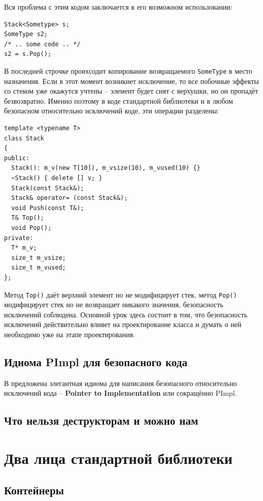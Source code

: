 \documentclass[a4paper,12pt,oneside]{article}
\begin{document}
Вся проблема с этим кодом заключается в его возможном использовании:

\begin{lstlisting}
Stack<Sometype> s;
SomeType s2;
/* .. some code .. */
s2 = s.Pop();
\end{lstlisting}

В последней строчке проихсодит копирование возвращаемого \lstinline!SomeType! в место назначения. Если в этот момент возникнет исключение, то все побочные эффекты со стеком уже окажутся учтены -- элемент будет снят с верхушки, но он пропадёт безвозвратно. Именно поэтому в коде стандартной библиотеки и в любом безопасном относительно исключений коде, эти операции разделены:

\begin{lstlisting}
template <typename T> 
class Stack
{
public:
  Stack(): m_v(new T[10]), m_vsize(10), m_vused(10) {}
  ~Stack() { delete [] v; }
  Stack(const Stack&);
  Stack& operator= (const Stack&);
  void Push(const T&);
  T& Top();
  void Pop();
private:
  T* m_v;
  size_t m_vsize;
  size_t m_vused;
};
\end{lstlisting}

Метод \lstinline!Top()! даёт верхний элемент но не модифицирует стек, метод \lstinline!Pop()! модифицирует стек но не возвращает никакого значения, безопасность исключений соблюдена. Основной урок здесь состоит в том, что безопасность исключений действительно влияет на проектирование класса и думать о ней необходимо уже на этапе проектирования.

\subsection{Идиома PImpl для безопасного кода}

В \cite{exceptionalcpp} предложена элегантная идиома для написания безопасного относительно исключений кода -- \textbf{Pointer to Implementation} или сокращённо PImpl.

\subsection{Что нельзя деструкторам и можно нам}

\pagebreak
\section{Два лица стандартной библиотеки}

\subsection{Контейнеры}
\end{document}
